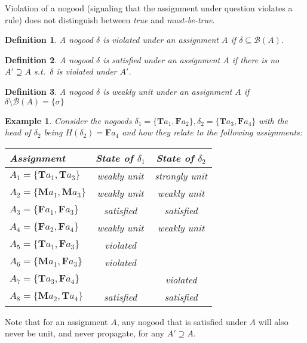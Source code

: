 \documentclass{vutinfth} %
\newtheorem{example}{Example}[chapter]
\newtheorem{definition}{Definition}[chapter]
\newcommand{\mbt}{must-be-true\xspace}
\newcommand{\bass}{\mathcal{B}}
\newcommand{\ass}{A}
\newcommand{\bT}{\mathbf{T}}
\newcommand{\bM}{\mathbf{M}}
\newcommand{\bF}{\mathbf{F}}
\newcommand{\headf}{H}
\newcommand{\bsgl}{\sigma}
\begin{document}
Violation of a nogood (signaling that the assignment under question violates a rule) does not distinguish between \emph{true} and \emph{\mbt}.

\begin{definition}
\label{def:vio}
A nogood $\delta$ is \emph{violated} under an assignment $\ass$ if $\delta \subseteq \bass(\ass)$.
\end{definition}

\begin{definition}
A nogood $\delta$ is \emph{satisfied} under an assignment $\ass$ if there is no $\ass' \supseteq \ass$ s.t.~$\delta$ is violated under $\ass'$.
\end{definition}

\begin{definition}
A nogood $\delta$ is \emph{weakly unit} under an assignment $\ass$ if $\delta \setminus \bass(\ass) = \{ \bsgl \}$
\end{definition}

\begin{example}
Consider the nogoods $\delta_1 = \{ \bT a_1, \bF a_2 \}, \delta_2 = \{ \bT a_3, \bF a_4 \}$ with the head of $\delta_2$ being $\headf(\delta_2) = \bF a_4$ and how they relate to the following assignments:
\begin{center}

\begin{tabular}{|l||c|c|}
\hline
Assignment & State of $\delta_1$ & State of $\delta_2$ \\
\hline\hline
$\ass_1 = \{ \bT a_1, \bT a_3 \}$ & weakly unit & strongly unit\\
$\ass_2 = \{ \bM a_1, \bM a_3 \}$ & weakly unit & weakly unit\\
$\ass_3 = \{ \bF a_1, \bF a_3 \}$ & satisfied & satisfied \\
$\ass_4 = \{ \bF a_2, \bF a_4 \}$ & weakly unit & weakly unit\\
$\ass_5 = \{ \bT a_1, \bF a_3 \}$ & violated & \\
$\ass_6 = \{ \bM a_1, \bF a_3 \}$ & violated & \\
$\ass_7 = \{ \bT a_3, \bF a_4 \}$ & & violated  \\
$\ass_8 = \{ \bM a_2, \bT a_4 \}$ & satisfied & satisfied \\
\hline
\end{tabular}
\end{center}
\end{example}

Note that for an assignment $\ass$, any nogood that is satisfied under $\ass$ will also never be unit, and never propagate, for any $\ass' \supseteq \ass$.
\end{document}
